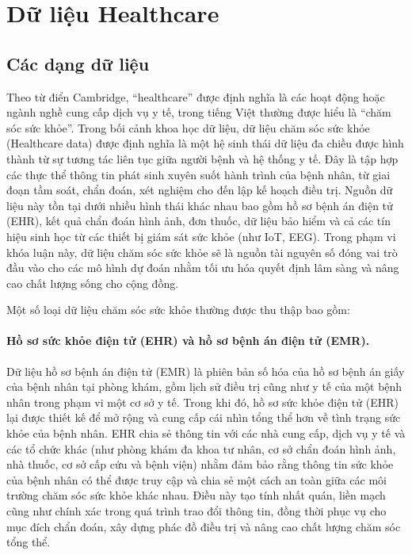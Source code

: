 \section{Dữ liệu Healthcare}
 
\subsection{Các dạng dữ liệu}
 
Theo từ điển Cambridge, ``healthcare'' được định nghĩa là các hoạt động hoặc ngành nghề cung cấp dịch vụ y tế, trong tiếng Việt thường được hiểu là ``chăm sóc sức khỏe''. Trong bối cảnh khoa học dữ liệu, dữ liệu chăm sóc sức khỏe (Healthcare data) được định nghĩa là một hệ sinh thái dữ liệu đa chiều được hình thành từ sự tương tác liên tục giữa người bệnh và hệ thống y tế. Đây là tập hợp các thực thể thông tin phát sinh xuyên suốt hành trình của bệnh nhân, từ giai đoạn tầm soát, chẩn đoán, xét nghiệm cho đến lập kế hoạch điều trị. Nguồn dữ liệu này tồn tại dưới nhiều hình thái khác nhau bao gồm hồ sơ bệnh án điện tử (EHR), kết quả chẩn đoán hình ảnh, đơn thuốc, dữ liệu bảo hiểm và cả các tín hiệu sinh học từ các thiết bị giám sát sức khỏe (như IoT, EEG). Trong phạm vi khóa luận này, dữ liệu chăm sóc sức khỏe sẽ là nguồn tài nguyên số đóng vai trò đầu vào cho các mô hình dự đoán nhằm tối ưu hóa quyết định lâm sàng và nâng cao chất lượng sống cho cộng đồng.
 
Một số loại dữ liệu chăm sóc sức khỏe thường được thu thập bao gồm:
 
\paragraph{Hồ sơ sức khỏe điện tử (EHR) và hồ sơ bệnh án điện tử (EMR).}
Dữ liệu hồ sơ bệnh án điện tử (EMR) là phiên bản số hóa của hồ sơ bệnh án giấy của bệnh nhân tại phòng khám, gồm lịch sử điều trị cũng như y tế của một bệnh nhân trong phạm vi một cơ sở y tế. Trong khi đó, hồ sơ sức khỏe điện tử (EHR) lại được thiết kế để mở rộng và cung cấp cái nhìn tổng thể hơn về tình trạng sức khỏe của bệnh nhân. EHR chia sẻ thông tin với các nhà cung cấp, dịch vụ y tế và các tổ chức khác (như phòng khám đa khoa tư nhân, cơ sở chẩn đoán hình ảnh, nhà thuốc, cơ sở cấp cứu và bệnh viện) nhằm đảm bảo rằng thông tin sức khỏe của bệnh nhân có thể được truy cập và chia sẻ một cách an toàn giữa các môi trường chăm sóc sức khỏe khác nhau. Điều này tạo tính nhất quán, liền mạch cũng như chính xác trong quá trình trao đổi thông tin, đồng thời phục vụ cho mục đích chẩn đoán, xây dựng phác đồ điều trị và nâng cao chất lượng chăm sóc tổng thể.
 
